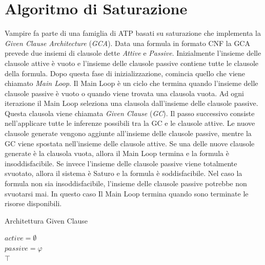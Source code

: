\documentclass[./main.tex]{subfiles}
\begin{document}
\section{Algoritmo di Saturazione} \label{sec:vampire_saturazione}
Vampire fa parte di una famiglia di ATP basati su saturazione che implementa la \textit{Given Clause Architecture} (\textit{GCA}).
Data una formula in formato CNF la GCA prevede due insiemi di clausole dette \textit{Attive} e \textit{Passive}.
Inizialmente l'insieme delle clausole attive è vuoto e l'insieme delle clausole passive contiene tutte le clausole della formula.
Dopo questa fase di inizializzazione, comincia quello che viene chiamato \textit{Main Loop}.
Il Main Loop è un ciclo che termina quando l'insieme delle clausole passive è vuoto o quando viene trovata una clausola vuota.
Ad ogni iterazione il Main Loop seleziona una clausola dall'insieme delle clausole passive. 
Questa clausola viene chiamata \textit{Given Clause} (\textit{GC}). 
Il passo successivo consiste nell'applicare tutte le inferenze possibili tra la GC e le clausole attive.
Le nuove clausole generate vengono aggiunte all'insieme delle clausole passive, mentre la GC viene spostata nell'insieme delle clausole attive.
Se una delle nuove clausole generate è la clausola vuota, allora il Main Loop termina e la formula è insoddisfacibile.
Se invece l'insieme delle clausole passive viene totalmente svuotato, allora il sistema è Saturo e la formula è soddisfacibile.
Nel caso la formula non sia insoddisfacibile, l'insieme delle clausole passive potrebbe non svuotarsi mai.
In questo caso Il Main Loop termina quando sono terminate le risorse disponibili.

\begin{algorithm}[H]
    \caption{Architettura Given Clause}


    $active = \emptyset$ \\
    $passive = \varphi$ \\

    \Return $\top$\;
\end{algorithm}
\end{document}

